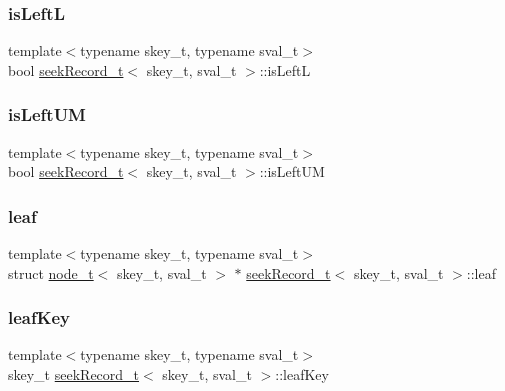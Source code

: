 \subsubsection{\texorpdfstring{is\+LeftL}{isLeftL}}
{\footnotesize\ttfamily template$<$typename skey\+\_\+t, typename sval\+\_\+t$>$ \\
bool \hyperlink{structseekRecord__t}{seek\+Record\+\_\+t}$<$ skey\+\_\+t, sval\+\_\+t $>$\+::is\+LeftL}

\mbox{\label{structseekRecord__t_aaea126d180e89701b44b673cd2d30d36}} 
\subsubsection{\texorpdfstring{is\+Left\+UM}{isLeftUM}}
{\footnotesize\ttfamily template$<$typename skey\+\_\+t, typename sval\+\_\+t$>$ \\
bool \hyperlink{structseekRecord__t}{seek\+Record\+\_\+t}$<$ skey\+\_\+t, sval\+\_\+t $>$\+::is\+Left\+UM}

\mbox{\label{structseekRecord__t_a05edd77abc8e8960567d3dcc11faa6da}} 
\subsubsection{\texorpdfstring{leaf}{leaf}}
{\footnotesize\ttfamily template$<$typename skey\+\_\+t, typename sval\+\_\+t$>$ \\
struct \hyperlink{structnode__t}{node\+\_\+t}$<$ skey\+\_\+t, sval\+\_\+t $>$ $\ast$ \hyperlink{structseekRecord__t}{seek\+Record\+\_\+t}$<$ skey\+\_\+t, sval\+\_\+t $>$\+::leaf}

\mbox{\label{structseekRecord__t_a242a55734b296c6b87d55848277b61ee}} 
\subsubsection{\texorpdfstring{leaf\+Key}{leafKey}}
{\footnotesize\ttfamily template$<$typename skey\+\_\+t, typename sval\+\_\+t$>$ \\
skey\+\_\+t \hyperlink{structseekRecord__t}{seek\+Record\+\_\+t}$<$ skey\+\_\+t, sval\+\_\+t $>$\+::leaf\+Key}

